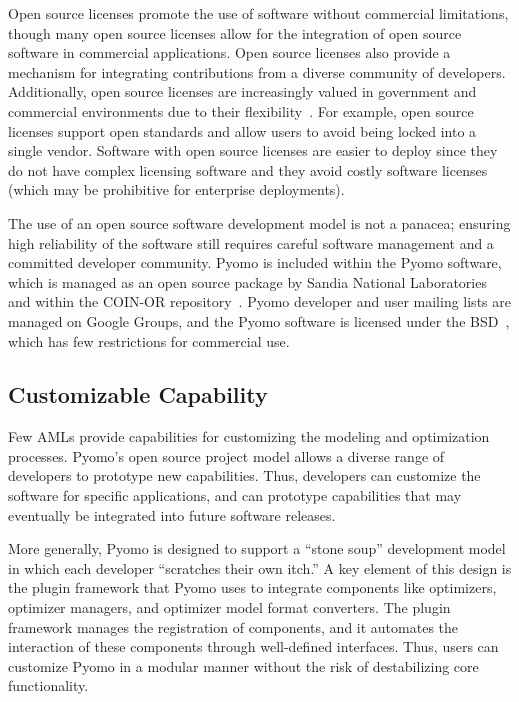Open source licenses promote the use of software without commercial
limitations, though many open source licenses allow for the integration
of open source software in commercial applications.  Open source
licenses also provide a mechanism for integrating contributions from a
diverse community of developers.  Additionally, open source licenses are
increasingly valued in government and commercial environments due to their
flexibility~\cite{Forrester}.  For example, open source licenses support
open standards and allow users to avoid being locked into a single vendor.
Software with open source licenses are easier to deploy since they do not
have complex licensing software and they avoid costly software licenses
(which may be prohibitive for enterprise deployments).

The use of an open source software development model is not a panacea;
ensuring high reliability of the software still requires careful software
management and a committed developer community.  Pyomo is included
within the Pyomo software, which is managed as an open source package
by Sandia National Laboratories~\cite{Pyomo} and within the COIN-OR
repository~\citep{COINOR}.  Pyomo developer and user mailing lists are
managed on Google Groups, and the Pyomo software is licensed under the
BSD~\citep{BSD}, which has few restrictions for commercial use.


\subsection{Customizable Capability}

Few AMLs provide capabilities for customizing the modeling
and optimization processes.  Pyomo's open source project model allows
a diverse range of developers to prototype new capabilities.  Thus,
developers can customize the software for specific applications, and
can prototype capabilities that may eventually be integrated into future
software releases.

More generally, Pyomo is designed to support a ``stone soup'' development
model in which each developer ``scratches their own itch.'' A key element
of this design is the plugin framework that Pyomo uses to integrate
components like optimizers, optimizer managers, and optimizer model
format converters.  The plugin framework manages the registration of
components, and it automates the interaction of these components through
well-defined interfaces.  Thus, users can customize Pyomo in a modular
manner without the risk of destabilizing core functionality.

